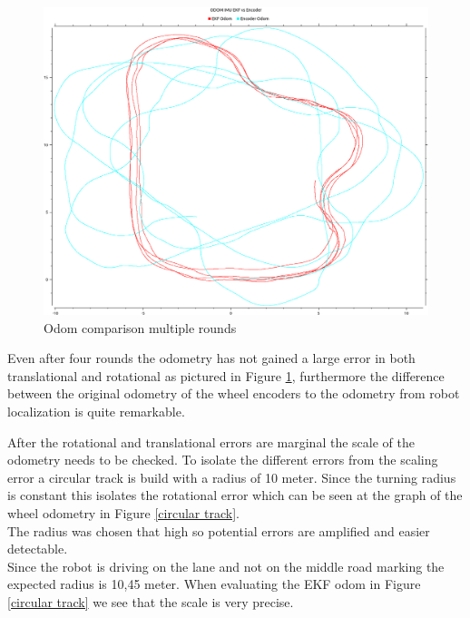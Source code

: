 \begin{figure}[H]
	\includegraphics[width=\textwidth]{Pictures/odom comp multiple rounds}
	\caption{Odom comparison multiple rounds}
	\label{Odom comparison multiple rounds}

\end{figure}

Even after four rounds the odometry has not gained a large error in both translational and rotational as pictured in Figure \ref{Odom comparison multiple rounds}, furthermore the difference between the original odometry of the wheel encoders to the odometry from robot localization is quite remarkable.

After the rotational and translational errors are marginal the scale of the odometry needs to be checked.
To isolate the different errors from the scaling error a circular track is build with a radius of 10 meter. Since the turning radius is constant this isolates the rotational error which can be seen at the graph of the wheel odometry in Figure \ref{circular track}.\\
The radius was chosen that high so potential errors are amplified and easier detectable.\\
Since the robot is driving on the lane and not on the middle road marking the expected radius is 10,45 meter. When evaluating the EKF odom in Figure \ref{circular track} we see that the scale is very precise.
 
